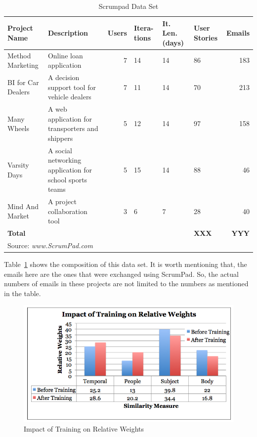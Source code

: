 \begin{table}
	\label{tab:scrumpad}
  \centering
  \caption{Scrumpad Data Set}
    \begin{tabular}{|p{2cm}|p{4cm}|r|p{1cm}|p{1.2cm}|p{1.2cm}|r|}
      \hline
      \textbf{Project Name} & \textbf{Description} & \textbf{Users} & \textbf{Itera- tions} & \textbf{It. Len. (days)}  & \textbf{User Stories} & \textbf{Emails}\\
      \hline
      Method Marketing & Online loan application & 7 & 14 & 14 & 86 & 183 \\
      \hline
      BI for Car Dealers & A decision support tool for vehicle dealers & 7 & 11 & 14 & 70 & 213 \\
      \hline
      Many Wheels & A web application for transporters and shippers & 5 & 12 & 14 & 97 & 158 \\
      \hline
      Varsity Days & A social networking application for school sports teams & 5 & 15 & 14 & 88 & 46 \\
      \hline
      Mind And Market & A project collaboration tool & 3 & 6 & 7 & 28 & 40 \\
      \hline
      \textbf{Total} &  &  &  &  & \textbf{XXX} & \textbf{YYY}\\
      \hline
      \multicolumn{7}{l}{Source: \emph{www.ScrumPad.com}}
    \end{tabular}
\end{table}

Table~\ref{tab:scrumpad} shows the composition of this data set. It is worth mentioning that, the emails here are the ones that were exchanged using ScrumPad. So, the actual numbers of emails in these projects are not limited to the numbers as mentioned in the table.

\begin{figure}[htb]
	\centering
	\includegraphics[width=\textwidth]{training.png}
    \caption{Impact of Training on Relative Weights}
	\label{fig:training}
\end{figure}

